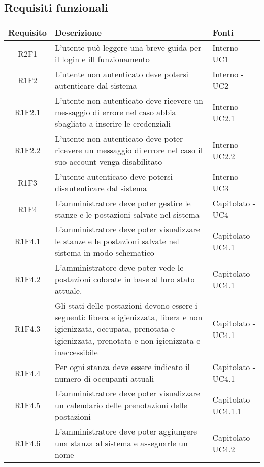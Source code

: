 \subsection{Requisiti funzionali}
\begin{center}
	\begin{longtable}{|c|p{10cm}|p{4cm}|}
		\hline
		\rowcolor{lighter-grayer}
		\textbf{Requisito} & \textbf{Descrizione} & \textbf{Fonti}  \\
		\hline
		\endfirsthead
		
		 R2F1 & L'utente può leggere una breve guida per il login e ill funzionamento & Interno - UC1 \\
		\hline
		R1F2	&	L'utente non autenticato deve potersi autenticare dal sistema& Interno - UC2	\\
		\hline
		R1F2.1	&	L'utente non autenticato deve ricevere un messaggio di errore nel caso abbia sbagliato a inserire le credenziali& Interno - UC2.1	\\
		\hline
		R1F2.2	&	L'utente non autenticato deve poter ricevere un messaggio di errore nel caso il suo account venga disabilitato& Interno - UC2.2	\\
		\hline
		R1F3	&	L'utente autenticato deve potersi disautenticare dal sistema& Interno - UC3	\\
		\hline
			R1F4&L'amministratore deve poter gestire le stanze e le postazioni salvate nel sistema	& Capitolato - UC4	\\
					\hline
			R1F4.1&L'amministratore deve poter visualizzare le stanze e le postazioni salvate nel sistema in modo schematico	& Capitolato - UC4.1	\\
					\hline
			R1F4.2&	L'amministratore deve poter vede le postazioni colorate in base al loro stato attuale.& Capitolato - UC4.1	\\
					\hline
			R1F4.3&	Gli stati delle postazioni devono essere i seguenti: libera e igienizzata, libera e non igienizzata, occupata, prenotata e igienizzata, prenotata e non igienizzata e inaccessibile& 	Capitolato - UC4.1\\
					\hline
			R1F4.4&Per ogni stanza deve essere indicato il numero di occupanti attuali	& Capitolato - UC4.1	\\
					\hline
			R1F4.5&L'amministratore deve poter visualizzare un calendario delle prenotazioni delle postazioni	& Capitolato - UC4.1.1	\\
					\hline
				R1F4.6&L'amministratore deve poter aggiungere una stanza al sistema e assegnarle un nome	& Capitolato - UC4.2	\\

\end{longtable}
\end{center}
